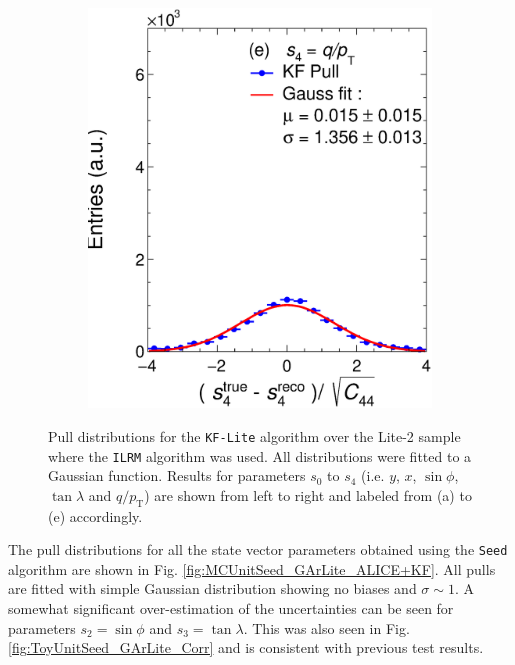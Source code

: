 \begin{figure}[t]
\begin{subfigure}{0.32\textwidth}
         \includegraphics[width=\textwidth]{figures/ch4-KF_NDGArLite/MC/ILRM+KF/UnitKFEnd_p4.eps}
         \caption{}
         \label{fig:resp4KF_GArLite_ILRM+KF}
     \end{subfigure}
        \caption[Pull distributions for the \texttt{KF-Lite} algorithm over the Lite-2 sample where the \texttt{ILRM} algorithm was used.]{Pull distributions for the \texttt{KF-Lite} algorithm over the Lite-2 sample where the \texttt{ILRM} algorithm was used. All distributions were fitted to a Gaussian function. Results for parameters $s_0$ to $s_4$ (i.e. $y$, $x$, $\sin\phi$, $\tan\lambda$ and $q/p_{\text{T}}$) are shown from left to right and labeled from (a) to (e) accordingly. }
        \label{fig:MCUnitKFEnd_GArLite_ILRM+KF}
\end{figure}

The pull distributions for all the state vector parameters obtained using the \texttt{Seed} algorithm are shown in Fig. \ref{fig:MCUnitSeed_GArLite_ALICE+KF}. All pulls are fitted with simple Gaussian distribution showing no biases and $\sigma\sim1$. A somewhat significant over-estimation of the uncertainties can be seen for parameters $s_2=\sin\phi$ and $s_3=\tan\lambda$. This was also seen in Fig. \ref{fig:ToyUnitSeed_GArLite_Corr} and is consistent with previous test results. 

